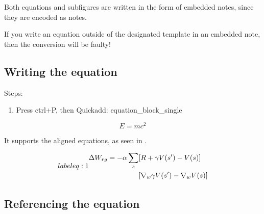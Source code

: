 \documentclass{extarticle}
\begin{document}
Both equations and subfigures are written in the form of embedded notes, since they are encoded as notes.

\begin{tcolorbox}[width=1.0\textwidth,colback={red},title={warning},outer arc=0mm,colupper=white]

If you write an equation outside of the designated template in an embedded note, then the conversion will be faulty!

\end{tcolorbox}

\subsection{Writing the equation}



Steps:



\begin{enumerate}

\item Press ctrl+P, then Quickadd: equation\_block\_single

\end{enumerate}



\begin{equation} \label{eq:Einstein}
	E=mc^{2}
\end{equation}




It supports the aligned equations, as seen in .



\begin{equation}\\label{eq:1}
\begin{aligned}
\Delta W_{rg} = -\alpha \sum_{s}&[R+\gamma V(s')-V(s)]  \\
&[\nabla_{w} \gamma V(s')-\nabla_{w}V(s)]
\end{aligned}
\end{equation}


\subsection{Referencing the equation}
\end{document}

